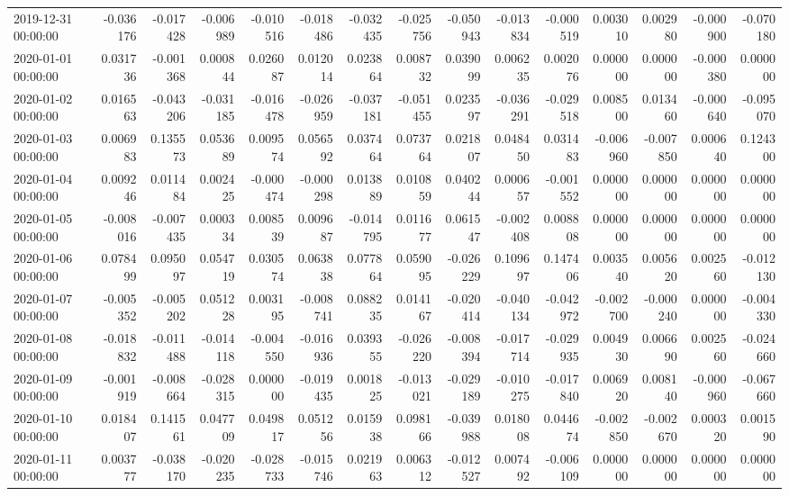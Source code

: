 \begin{tabular}{lrrrrrrrrrrrrrr}
2019-12-31 00:00:00 & -0.036176 & -0.017428 & -0.006989 & -0.010516 & -0.018486 & -0.032435 & -0.025756 & -0.050943 & -0.013834 & -0.000519 & 0.003010 & 0.002980 & -0.000900 & -0.070180 \\
2020-01-01 00:00:00 & 0.031736 & -0.001368 & 0.000844 & 0.026087 & 0.012014 & 0.023864 & 0.008732 & 0.039099 & 0.006235 & 0.002076 & 0.000000 & 0.000000 & -0.000380 & 0.000000 \\
2020-01-02 00:00:00 & 0.016563 & -0.043206 & -0.031185 & -0.016478 & -0.026959 & -0.037181 & -0.051455 & 0.023597 & -0.036291 & -0.029518 & 0.008500 & 0.013460 & -0.000640 & -0.095070 \\
2020-01-03 00:00:00 & 0.006983 & 0.135573 & 0.053689 & 0.009574 & 0.056592 & 0.037464 & 0.073764 & 0.021807 & 0.048450 & 0.031483 & -0.006960 & -0.007850 & 0.000640 & 0.124300 \\
2020-01-04 00:00:00 & 0.009246 & 0.011484 & 0.002425 & -0.000474 & -0.000298 & 0.013889 & 0.010859 & 0.040244 & 0.000657 & -0.001552 & 0.000000 & 0.000000 & 0.000000 & 0.000000 \\
2020-01-05 00:00:00 & -0.008016 & -0.007435 & 0.000334 & 0.008539 & 0.009687 & -0.014795 & 0.011677 & 0.061547 & -0.002408 & 0.008808 & 0.000000 & 0.000000 & 0.000000 & 0.000000 \\
2020-01-06 00:00:00 & 0.078499 & 0.095097 & 0.054719 & 0.030574 & 0.063838 & 0.077864 & 0.059095 & -0.026229 & 0.109697 & 0.147406 & 0.003540 & 0.005620 & 0.002560 & -0.012130 \\
2020-01-07 00:00:00 & -0.005352 & -0.005202 & 0.051228 & 0.003195 & -0.008741 & 0.088235 & 0.014167 & -0.020414 & -0.040134 & -0.042972 & -0.002700 & -0.000240 & 0.000000 & -0.004330 \\
2020-01-08 00:00:00 & -0.018832 & -0.011488 & -0.014118 & -0.004550 & -0.016936 & 0.039355 & -0.026220 & -0.008394 & -0.017714 & -0.029935 & 0.004930 & 0.006690 & 0.002560 & -0.024660 \\
2020-01-09 00:00:00 & -0.001919 & -0.008664 & -0.028315 & 0.000000 & -0.019435 & 0.001825 & -0.013021 & -0.029189 & -0.010275 & -0.017840 & 0.006920 & 0.008140 & -0.000960 & -0.067660 \\
2020-01-10 00:00:00 & 0.018407 & 0.141561 & 0.047709 & 0.049817 & 0.051256 & 0.015938 & 0.098166 & -0.039988 & 0.018008 & 0.044674 & -0.002850 & -0.002670 & 0.000320 & 0.001590 \\
2020-01-11 00:00:00 & 0.003777 & -0.038170 & -0.020235 & -0.028733 & -0.015746 & 0.021963 & 0.006312 & -0.012527 & 0.007492 & -0.006109 & 0.000000 & 0.000000 & 0.000000 & 0.000000 \\

\end{tabular}
